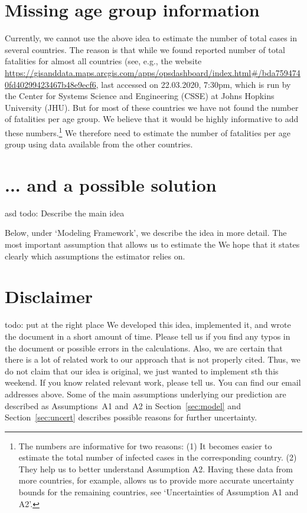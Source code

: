 \documentclass[a4paper]{article}
\newcommand\todo[1]{{\color{red}todo: #1}}
\begin{document}
\section{Missing age group information} \label{sec:noage}
Currently, we cannot use the above idea to 
estimate the number of total cases in 
several countries. The reason is that 
while we found reported number of total fatalities 
for almost all countries 
(see, e.g., the website {\footnotesize
\url{https://gisanddata.maps.arcgis.com/apps/opsdashboard/index.html#/bda7594740fd40299423467b48e9ecf6}},
last accessed on 22.03.2020, 7:30pm,
which is run by the Center for Systems Science and Engineering ({CSSE}) at Johns Hopkins University ({JHU}).
But for most of these countries we have not found the number of fatalities per age group. 
We believe that it would be highly informative to add these numbers.\footnote{The numbers 
are informative for two reasons: (1) It
becomes easier to estimate the 
total number of infected cases in the 
corresponding country.
(2) They help us to better understand Assumption A2. Having these data from 
more countries, for example, 
allows us to 
provide more accurate uncertainty bounds for 
the remaining countries, see `Uncertainties of Assumption A1 and A2'.}
We therefore need to estimate the number of fatalities per age group using data available from the other countries.


\section{... and a possible solution}
asd 
\todo{Describe the main idea}

Below, under `Modeling Framework', we describe the idea in more detail. 
The most important assumption that allows us to estimate 
the 
We hope that it states
clearly which assumptions the estimator
relies on.





\section{Disclaimer} \label{sec:disclaimer}
\todo{
put 
\citet{linton2020epidemiological}
at the right place}
We 
developed this idea, implemented it, and 
wrote the 
document in a short amount of time. Please tell us if you find any typos 
in the document or possible errors in 
the calculations. 
Also, we are certain that there is a lot of 
related work to our approach that is not properly cited. 
Thus, we do not claim that our idea is original, we just wanted
to implement sth this weekend.
If you know related relevant work, please tell us.
You can find our email addresses above.
Some of the main assumptions underlying our prediction are described 
as Assumptions~A1 and~A2 in Section~\ref{sec:model} and
Section~\ref{sec:uncert} describes possible reasons for further uncertainty.
\end{document}
